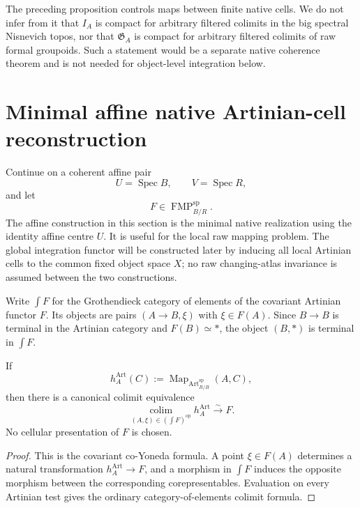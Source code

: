 \begin{remark}
The preceding proposition controls maps between finite native cells.  We do
not infer from it that $I_A$ is compact for arbitrary filtered colimits in the
big spectral Nisnevich topos, nor that $\mathfrak G_A$ is compact for arbitrary
filtered colimits of raw formal groupoids.  Such a statement would be a
separate native coherence theorem and is not needed for object-level
integration below.
\end{remark}

\section{Minimal affine native Artinian-cell reconstruction}
\label{sec:bnli-native-quotient}

Continue on a coherent affine pair
\[
    U=\operatorname{Spec}B,
    \qquad
    V=\operatorname{Spec}R,
\]
and let
\[
    F\in\operatorname{FMP}^{\mathrm{sp}}_{B/R}.
\]
The affine construction in this section is the minimal native realization using
the identity affine centre $U$.  It is useful for the local raw mapping
problem.  The global integration functor will be constructed later by inducing
all local Artinian cells to the common fixed object space $X$; no raw
changing-atlas invariance is assumed between the two constructions.

Write $\int F$ for the Grothendieck category of elements of the covariant
Artinian functor $F$.  Its objects are pairs $(A\to B,\xi)$ with
$\xi\in F(A)$.  Since $B\to B$ is terminal in the Artinian category and
$F(B)\simeq *$, the object $(B,*)$ is terminal in $\int F$.

\begin{lemma}
\label{lem:bnli-artinian-coyoneda-resolution}
If
\[
    h_A^{\mathrm{Art}}(C)
    :=
    \operatorname{Map}_{\operatorname{Art}^{\mathrm{sp}}_{R/B}}(A,C),
\]
then there is a canonical colimit equivalence
\[
\boxed{
    \operatorname*{colim}_{(A,\xi)\in(\int F)^{\mathrm{op}}}
    h_A^{\mathrm{Art}}
    \xrightarrow{\sim}
    F.}
\]
No cellular presentation of $F$ is chosen.
\end{lemma}

\begin{proof}
This is the covariant co-Yoneda formula.  A point $\xi\in F(A)$ determines a
natural transformation $h_A^{\mathrm{Art}}\to F$, and a morphism in
$\int F$ induces the opposite morphism between the corresponding
corepresentables.  Evaluation on every Artinian test gives the ordinary
category-of-elements colimit formula.
\end{proof}

